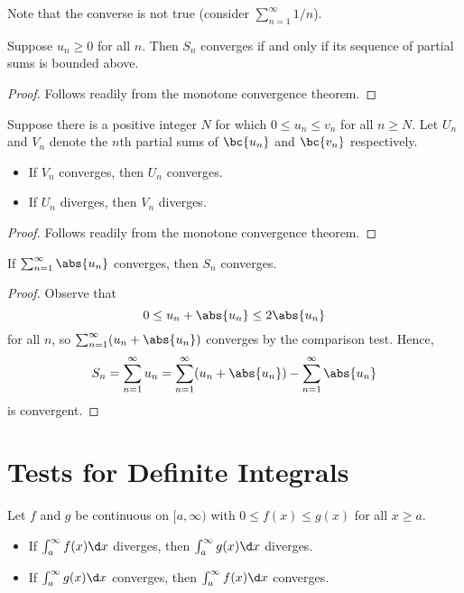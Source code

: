 Note that the converse is not true (consider $\sum_{n = 1}^\infty 1/n$).

\begin{theorem}
    Suppose $u_n \geq 0$ for all $n$. Then $S_n$ converges if and only if its sequence of partial sums is bounded above.
\end{theorem}
\begin{proof}
    Follows readily from the monotone convergence theorem.
\end{proof}

\begin{theorem}
    Suppose there is a positive integer $N$ for which $0 \leq u_n \leq v_n$ for all $n \geq N$. Let $U_n$ and $V_n$ denote the $n$th partial sums of $\bc{u_n}$ and $\bc{v_n}$ respectively.
    \begin{itemize}
        \item If $V_n$ converges, then $U_n$ converges.
        \item If $U_n$ diverges, then $V_n$ diverges.
    \end{itemize}
\end{theorem}
\begin{proof}
    Follows readily from the monotone convergence theorem.
\end{proof}

\begin{theorem}
    If $\sum_{n = 1}^\infty \abs{u_n}$ converges, then $S_n$ converges.
\end{theorem}
\begin{proof}
    Observe that \[0 \leq u_n + \abs{u_n} \leq 2 \abs{u_n}\] for all $n$, so $\sum_{n = 1}^\infty (u_n + \abs{u_n})$ converges by the comparison test. Hence, \[S_n = \sum_{n = 1}^\infty u_n = \sum_{n = 1}^\infty (u_n + \abs{u_n}) - \sum_{n = 1}^\infty \abs{u_n}\] is convergent.
\end{proof}

\section{Tests for Definite Integrals}

\begin{proposition}
    Let $f$ and $g$ be continuous on $[a, \infty)$ with $0 \leq f(x) \leq g(x)$ for all $x \geq a$.
    \begin{itemize}
        \item If $\int_a^\infty f(x) \d x$ diverges, then $\int_a^\infty g(x) \d x$ diverges.
        \item If $\int_a^\infty g(x) \d x$ converges, then $\int_a^\infty f(x) \d x$ converges.
    \end{itemize}
\end{proposition}

